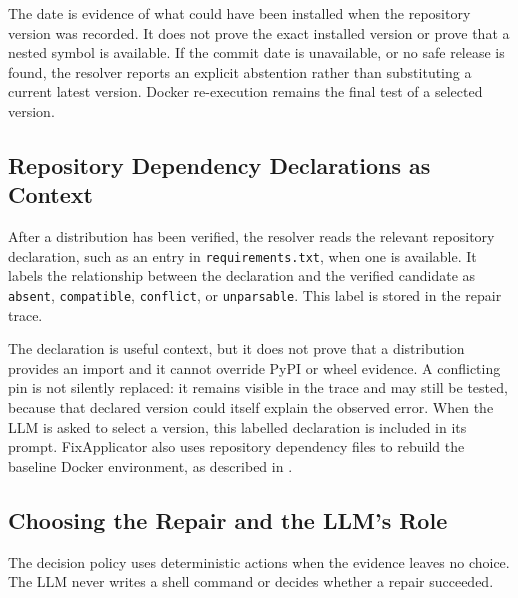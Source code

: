 The date is evidence of what could have been installed when the repository
version was recorded. It does not prove the exact installed version or prove
that a nested symbol is available. If the commit date is unavailable, or no
safe release is found, the resolver reports an explicit abstention rather than
substituting a current latest version. Docker re-execution remains the final
test of a selected version.

\subsection{Repository Dependency Declarations as Context}
\label{sec:m-repair-nodeps}

After a distribution has been verified, the resolver reads the relevant
repository declaration, such as an entry in \texttt{requirements.txt}, when
one is available. It labels the relationship between the declaration and the
verified candidate as \texttt{absent}, \texttt{compatible}, \texttt{conflict},
or \texttt{unparsable}. This label is stored in the repair trace.

The declaration is useful context, but it does not prove that a distribution
provides an import and it cannot override PyPI or wheel evidence. A conflicting
pin is not silently replaced: it remains visible in the trace and may still be
tested, because that declared version could itself explain the observed error.
When the LLM is asked to select a version, this labelled declaration is included
in its prompt. FixApplicator also uses repository dependency files to rebuild
the baseline Docker environment, as described in .

\subsection{Choosing the Repair and the LLM's Role}

The decision policy uses deterministic actions when the evidence leaves no
choice. The LLM never writes a shell command or decides whether a repair
succeeded.

